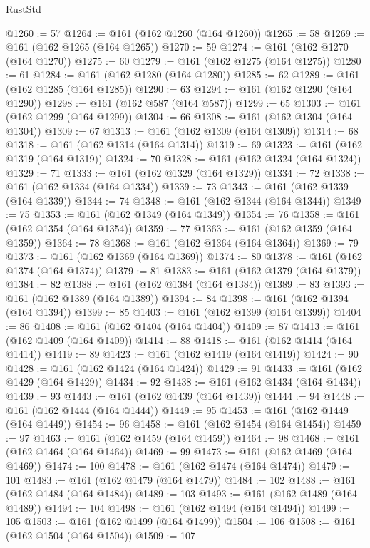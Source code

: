 \begin{lexlean}{RustStd}
\begin{coremodule}
@1260 := 57
@1264 := @161 (@162 @1260 (@164 @1260))
@1265 := 58
@1269 := @161 (@162 @1265 (@164 @1265))
@1270 := 59
@1274 := @161 (@162 @1270 (@164 @1270))
@1275 := 60
@1279 := @161 (@162 @1275 (@164 @1275))
@1280 := 61
@1284 := @161 (@162 @1280 (@164 @1280))
@1285 := 62
@1289 := @161 (@162 @1285 (@164 @1285))
@1290 := 63
@1294 := @161 (@162 @1290 (@164 @1290))
@1298 := @161 (@162 @587 (@164 @587))
@1299 := 65
@1303 := @161 (@162 @1299 (@164 @1299))
@1304 := 66
@1308 := @161 (@162 @1304 (@164 @1304))
@1309 := 67
@1313 := @161 (@162 @1309 (@164 @1309))
@1314 := 68
@1318 := @161 (@162 @1314 (@164 @1314))
@1319 := 69
@1323 := @161 (@162 @1319 (@164 @1319))
@1324 := 70
@1328 := @161 (@162 @1324 (@164 @1324))
@1329 := 71
@1333 := @161 (@162 @1329 (@164 @1329))
@1334 := 72
@1338 := @161 (@162 @1334 (@164 @1334))
@1339 := 73
@1343 := @161 (@162 @1339 (@164 @1339))
@1344 := 74
@1348 := @161 (@162 @1344 (@164 @1344))
@1349 := 75
@1353 := @161 (@162 @1349 (@164 @1349))
@1354 := 76
@1358 := @161 (@162 @1354 (@164 @1354))
@1359 := 77
@1363 := @161 (@162 @1359 (@164 @1359))
@1364 := 78
@1368 := @161 (@162 @1364 (@164 @1364))
@1369 := 79
@1373 := @161 (@162 @1369 (@164 @1369))
@1374 := 80
@1378 := @161 (@162 @1374 (@164 @1374))
@1379 := 81
@1383 := @161 (@162 @1379 (@164 @1379))
@1384 := 82
@1388 := @161 (@162 @1384 (@164 @1384))
@1389 := 83
@1393 := @161 (@162 @1389 (@164 @1389))
@1394 := 84
@1398 := @161 (@162 @1394 (@164 @1394))
@1399 := 85
@1403 := @161 (@162 @1399 (@164 @1399))
@1404 := 86
@1408 := @161 (@162 @1404 (@164 @1404))
@1409 := 87
@1413 := @161 (@162 @1409 (@164 @1409))
@1414 := 88
@1418 := @161 (@162 @1414 (@164 @1414))
@1419 := 89
@1423 := @161 (@162 @1419 (@164 @1419))
@1424 := 90
@1428 := @161 (@162 @1424 (@164 @1424))
@1429 := 91
@1433 := @161 (@162 @1429 (@164 @1429))
@1434 := 92
@1438 := @161 (@162 @1434 (@164 @1434))
@1439 := 93
@1443 := @161 (@162 @1439 (@164 @1439))
@1444 := 94
@1448 := @161 (@162 @1444 (@164 @1444))
@1449 := 95
@1453 := @161 (@162 @1449 (@164 @1449))
@1454 := 96
@1458 := @161 (@162 @1454 (@164 @1454))
@1459 := 97
@1463 := @161 (@162 @1459 (@164 @1459))
@1464 := 98
@1468 := @161 (@162 @1464 (@164 @1464))
@1469 := 99
@1473 := @161 (@162 @1469 (@164 @1469))
@1474 := 100
@1478 := @161 (@162 @1474 (@164 @1474))
@1479 := 101
@1483 := @161 (@162 @1479 (@164 @1479))
@1484 := 102
@1488 := @161 (@162 @1484 (@164 @1484))
@1489 := 103
@1493 := @161 (@162 @1489 (@164 @1489))
@1494 := 104
@1498 := @161 (@162 @1494 (@164 @1494))
@1499 := 105
@1503 := @161 (@162 @1499 (@164 @1499))
@1504 := 106
@1508 := @161 (@162 @1504 (@164 @1504))
@1509 := 107

\end{coremodule}
\end{lexlean}
